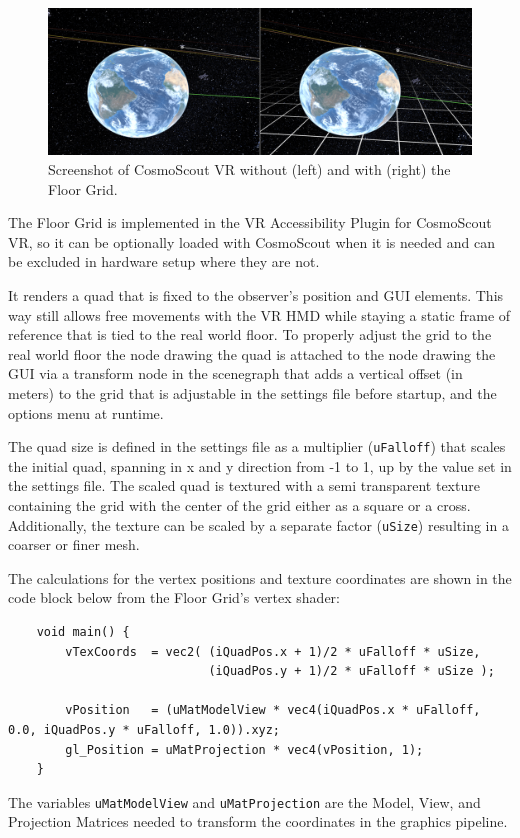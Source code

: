 \begin{figure}[h]
    \centering
    \includegraphics[width=\textwidth]{content/4_1_floorGrid/img/FloorGrid_Screenshot}
    \caption{Screenshot of CosmoScout VR without (left) and with (right) the Floor Grid.}
    \label{fig:floor-grid-screenshot}
\end{figure}

The Floor Grid is implemented in the VR Accessibility Plugin for CosmoScout VR, so it can be optionally loaded with
CosmoScout when it is needed and can be excluded in hardware setup where they are not.

It renders a quad that is fixed to the observer's position and GUI elements.
This way still allows free movements with the VR HMD while staying a static frame of reference that is tied to
the real world floor.
To properly adjust the grid to the real world floor the node drawing the quad is attached to the node drawing the GUI
via a transform node in the scenegraph that adds a vertical offset (in meters) to the grid that is adjustable in the
settings file before startup, and the options menu at runtime.

The quad size is defined in the settings file as a multiplier (\texttt{uFalloff}) that scales
the initial quad, spanning in x and y direction from -1 to 1, up by the value set in the settings file.
The scaled quad is textured with a semi transparent texture containing the grid with the center of the grid either as a
square or a cross.
Additionally, the texture can be scaled by a separate factor (\texttt{uSize}) resulting in a
coarser or finer mesh.

The calculations for the vertex positions and texture coordinates are shown in the code block below from the Floor
Grid's vertex shader:
\begin{verbatim}
    void main() {
        vTexCoords  = vec2( (iQuadPos.x + 1)/2 * uFalloff * uSize,
                            (iQuadPos.y + 1)/2 * uFalloff * uSize );

        vPosition   = (uMatModelView * vec4(iQuadPos.x * uFalloff, 0.0, iQuadPos.y * uFalloff, 1.0)).xyz;
        gl_Position = uMatProjection * vec4(vPosition, 1);
    }
\end{verbatim}
The variables \texttt{uMatModelView} and \texttt{uMatProjection} are the Model, View, and Projection
Matrices needed to transform the coordinates in the graphics pipeline.


